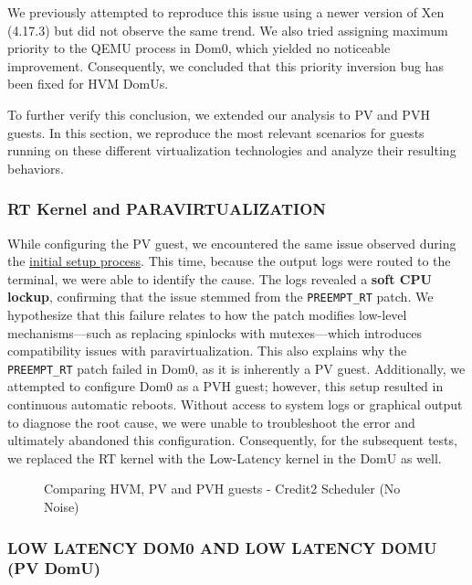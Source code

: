 We previously attempted to reproduce this issue using a newer version of
Xen (4.17.3) but did not observe the same trend. We also tried assigning
maximum priority to the QEMU process in Dom0, which yielded no
noticeable improvement. Consequently, we concluded that this priority
inversion bug has been fixed for HVM DomUs.

To further verify this conclusion, we extended our analysis to PV and
PVH guests. In this section, we reproduce the most relevant scenarios
for guests running on these different virtualization technologies and
analyze their resulting behaviors.

\subsubsection{RT Kernel and
PARAVIRTUALIZATION}\label{rt-kernel-and-paravirtualization}

While configuring the PV guest, we encountered the same issue observed
during the \href{../Setup/README.md\#problems-with-preempt_rt}{initial
setup process}. This time, because the output logs were routed to the
terminal, we were able to identify the cause. The logs revealed a
\textbf{soft CPU lockup}, confirming that the issue stemmed from the
\texttt{PREEMPT\_RT} patch. We hypothesize that this failure relates to
how the patch modifies low-level mechanisms---such as replacing
spinlocks with mutexes---which introduces compatibility issues with
paravirtualization. This also explains why the \texttt{PREEMPT\_RT}
patch failed in Dom0, as it is inherently a PV guest. Additionally, we
attempted to configure Dom0 as a PVH guest; however, this setup resulted
in continuous automatic reboots. Without access to system logs or
graphical output to diagnose the root cause, we were unable to
troubleshoot the error and ultimately abandoned this configuration.
Consequently, for the subsequent tests, we replaced the RT kernel with
the Low-Latency kernel in the DomU as well.

\begin{figure}
\centering

\caption{Comparing HVM, PV and PVH guests - Credit2 Scheduler (No
Noise)}
\end{figure}

\subsubsection{LOW LATENCY DOM0 AND LOW LATENCY DOMU (PV
DomU)}\label{low-latency-dom0-and-low-latency-domu-pv-domu}

